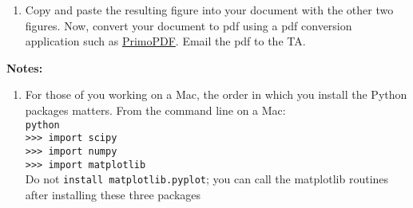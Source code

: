 \documentclass[12pt]{article}
\begin{document}
\begin{enumerate}
\item Copy and paste the resulting figure into your document with the other two figures. Now, convert your document to pdf using a pdf conversion application such as \href{http://www.primopdf.com/index.aspx}{PrimoPDF}. Email the pdf to the TA.

\end{enumerate}

\noindent \textbf{Notes:}

\begin{enumerate}
\item For those of you working on a Mac, the order in which you install the Python packages matters. From the command line on a Mac:\\
    \texttt{python} \\
    \texttt{>>> import scipy} \\
    \texttt{>>> import numpy} \\
    \texttt{>>> import matplotlib} \\
    Do not \texttt{install matplotlib.pyplot}; you can call the matplotlib routines after installing these three packages
\end{enumerate}
\end{document}
